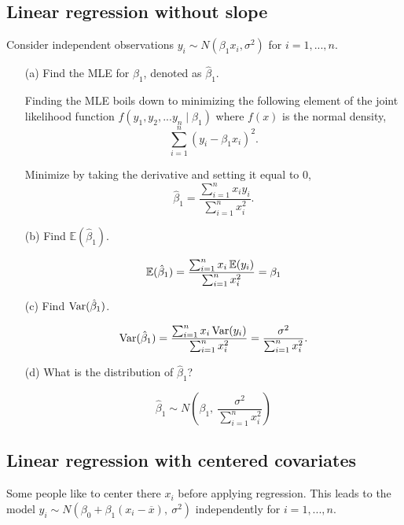 \documentclass{tufte-book}
\begin{document}
\subsection{Linear regression without slope} Consider independent observations $y_i \sim N(\beta_1x_i, \sigma^2)$ for $i=1,...,n$.

\begin{enumerate}

\item[(a)] Find the MLE for $\beta_1$, denoted as $\hat{\beta}_1$.

Finding the MLE boils down to minimizing the following element of the joint likelihood function $f(y_1,y_2,...y_n\mid \beta_1)$ where $f(x)$ is the normal density,
\[ \sum_{i=1}^n(y_i-\beta_1x_i)^2. \]

Minimize by taking the derivative and setting it equal to $0$,
\[ \hat{\beta}_1 = \frac{\sum_{i=1}^n x_iy_i}{\sum_{i=1}^nx_i^2}. \]

\item[(b)] Find $\mathbb{E}(\hat{\beta}_1)$.

\[ \operatorname{\mathbb{E}}(\hat{\beta}_1) = \frac{\sum_{i=1}^n x_i\operatorname{\mathbb{E}}(y_i)}{\sum_{i=1}^nx_i^2} = \beta_1 \]

\item[(c)] Find $\operatorname{Var}(\hat{\beta}_1)$.

\[ \operatorname{Var}(\hat{\beta}_1) = \frac{\sum_{i=1}^n x_i\operatorname{Var}(y_i)}{\sum_{i=1}^nx_i^2}= \frac{\sigma^2}{\sum_{i=1}^nx_i^2} .\]

\item[(d)] What is the distribution of $\hat{\beta}_1$?

\[ \hat{\beta}_1 \sim N(\beta_1, \ \frac{\sigma^2}{\sum_{i=1}^nx_i^2}) \]

\end{enumerate}

\subsection{Linear regression with centered covariates} Some people like to center there $x_i$ before applying regression.  This leads to the model $y_i \sim N(\beta_0 + \beta_1(x_i-\overline{x}), \ \sigma^2)$ independently for $i=1,...,n$.
\end{document}
